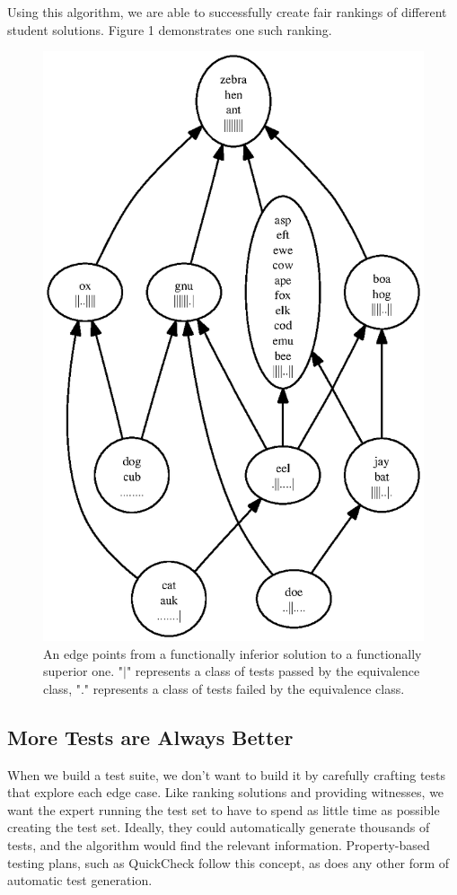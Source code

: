 \documentclass[11pt,twoside]{article}
\theoremstyle{definition}
\let\cite=\citep
\begin{document}
Using this algorithm, we are able to successfully create fair rankings of different student solutions. Figure 1 demonstrates one such ranking.

\begin{figure}
\centering
\includegraphics{rank1.ps}
\caption{An edge points from a functionally inferior solution to a functionally superior one. "$\vert$" represents a class of tests passed by the equivalence class, "." represents a class of tests failed by the equivalence class.}
\end{figure}

\subsection{More Tests are Always Better}
When we build a test suite, we don't want to build it by carefully crafting tests that explore each edge case. Like ranking solutions and providing witnesses, we want the expert running the test set to have to spend as little time as possible creating the test set. Ideally, they could automatically generate thousands of tests, and the algorithm would find the relevant information. Property-based testing plans, such as QuickCheck \cite{QuickCheck} follow this concept, as does any other form of automatic test generation.
\end{document}
